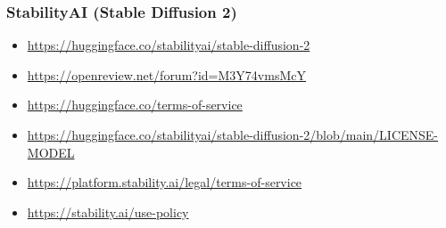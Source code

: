 \subsubsection{StabilityAI (Stable Diffusion 2)}
\begin{itemize}
\item \url{https://huggingface.co/stabilityai/stable-diffusion-2}
\item \url{https://openreview.net/forum?id=M3Y74vmsMcY}
\item \url{https://huggingface.co/terms-of-service}
\item \url{https://huggingface.co/stabilityai/stable-diffusion-2/blob/main/LICENSE-MODEL}
\item \url{https://platform.stability.ai/legal/terms-of-service}
\item \url{https://stability.ai/use-policy}
\end{itemize}
\clearpage